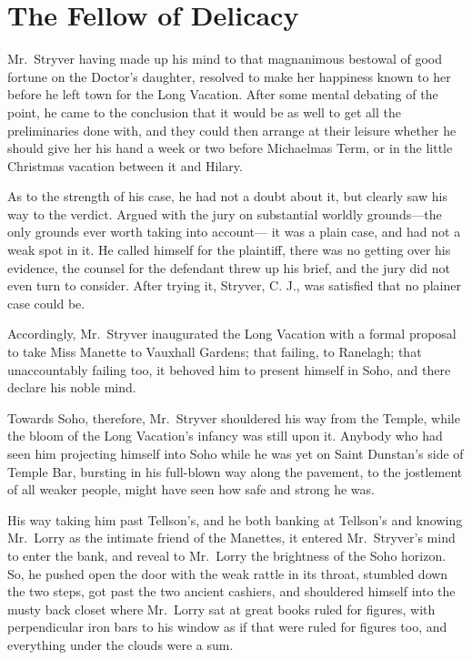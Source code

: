 \chapter{The Fellow of Delicacy}


Mr.\ Stryver having made up his mind to that magnanimous bestowal of
good fortune on the Doctor's daughter, resolved to make her happiness
known to her before he left town for the Long Vacation.  After some
mental debating of the point, he came to the conclusion that it would
be as well to get all the preliminaries done with, and they could
then arrange at their leisure whether he should give her his hand a
week or two before Michaelmas Term, or in the little Christmas vacation
between it and Hilary.

As to the strength of his case, he had not a doubt about it, but
clearly saw his way to the verdict.  Argued with the jury on substantial
worldly grounds---the only grounds ever worth taking into account---%
it was a plain case, and had not a weak spot in it.  He called himself
for the plaintiff, there was no getting over his evidence, the counsel
for the defendant threw up his brief, and the jury did not even turn
to consider.  After trying it, Stryver, C. J., was satisfied that no
plainer case could be.

Accordingly, Mr.\ Stryver inaugurated the Long Vacation with a
formal proposal to take Miss Manette to Vauxhall Gardens; that failing,
to Ranelagh; that unaccountably failing too, it behoved him to present
himself in Soho, and there declare his noble mind.

Towards Soho, therefore, Mr.\ Stryver shouldered his way from the
Temple, while the bloom of the Long Vacation's infancy was still upon
it.  Anybody who had seen him projecting himself into Soho while he
was yet on Saint Dunstan's side of Temple Bar, bursting in his
full-blown way along the pavement, to the jostlement of all weaker
people, might have seen how safe and strong he was.

His way taking him past Tellson's, and he both banking at Tellson's
and knowing Mr.\ Lorry as the intimate friend of the Manettes, it
entered Mr.\ Stryver's mind to enter the bank, and reveal to Mr.\ Lorry
the brightness of the Soho horizon.  So, he pushed open the door with
the weak rattle in its throat, stumbled down the two steps, got past
the two ancient cashiers, and shouldered himself into the musty back
closet where Mr.\ Lorry sat at great books ruled for figures, with
perpendicular iron bars to his window as if that were ruled for
figures too, and everything under the clouds were a sum.


